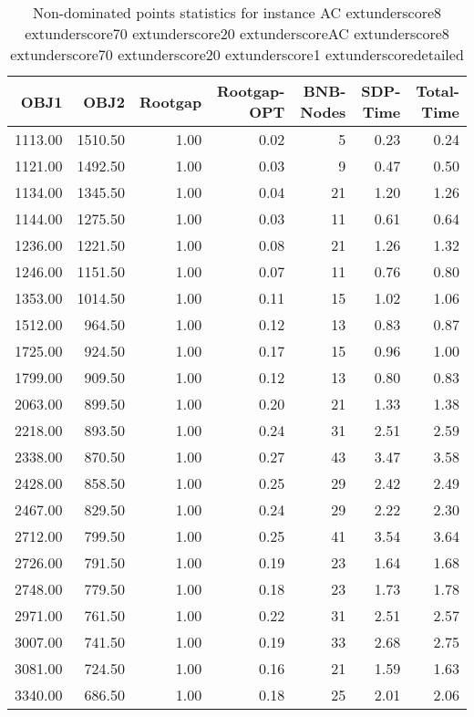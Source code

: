 \begin{table}
\caption{Non-dominated points statistics for instance AC	extunderscore8	extunderscore70	extunderscore20	extunderscoreAC	extunderscore8	extunderscore70	extunderscore20	extunderscore1	extunderscoredetailed}
\label{tab:stats/AC_8_70_20_AC_8_70_20_1_detailed}
\begin{tabular}{rrrrrrr}
\toprule
OBJ1 & OBJ2 & Rootgap & Rootgap-OPT & BNB-Nodes & SDP-Time & Total-Time \\
\midrule
1113.00 & 1510.50 & 1.00 & 0.02 & 5 & 0.23 & 0.24 \\
1121.00 & 1492.50 & 1.00 & 0.03 & 9 & 0.47 & 0.50 \\
1134.00 & 1345.50 & 1.00 & 0.04 & 21 & 1.20 & 1.26 \\
1144.00 & 1275.50 & 1.00 & 0.03 & 11 & 0.61 & 0.64 \\
1236.00 & 1221.50 & 1.00 & 0.08 & 21 & 1.26 & 1.32 \\
1246.00 & 1151.50 & 1.00 & 0.07 & 11 & 0.76 & 0.80 \\
1353.00 & 1014.50 & 1.00 & 0.11 & 15 & 1.02 & 1.06 \\
1512.00 & 964.50 & 1.00 & 0.12 & 13 & 0.83 & 0.87 \\
1725.00 & 924.50 & 1.00 & 0.17 & 15 & 0.96 & 1.00 \\
1799.00 & 909.50 & 1.00 & 0.12 & 13 & 0.80 & 0.83 \\
2063.00 & 899.50 & 1.00 & 0.20 & 21 & 1.33 & 1.38 \\
2218.00 & 893.50 & 1.00 & 0.24 & 31 & 2.51 & 2.59 \\
2338.00 & 870.50 & 1.00 & 0.27 & 43 & 3.47 & 3.58 \\
2428.00 & 858.50 & 1.00 & 0.25 & 29 & 2.42 & 2.49 \\
2467.00 & 829.50 & 1.00 & 0.24 & 29 & 2.22 & 2.30 \\
2712.00 & 799.50 & 1.00 & 0.25 & 41 & 3.54 & 3.64 \\
2726.00 & 791.50 & 1.00 & 0.19 & 23 & 1.64 & 1.68 \\
2748.00 & 779.50 & 1.00 & 0.18 & 23 & 1.73 & 1.78 \\
2971.00 & 761.50 & 1.00 & 0.22 & 31 & 2.51 & 2.57 \\
3007.00 & 741.50 & 1.00 & 0.19 & 33 & 2.68 & 2.75 \\
3081.00 & 724.50 & 1.00 & 0.16 & 21 & 1.59 & 1.63 \\
3340.00 & 686.50 & 1.00 & 0.18 & 25 & 2.01 & 2.06 \\
\bottomrule
\end{tabular}
\end{table}

